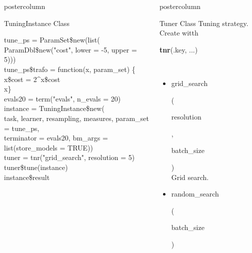 \documentclass{beamer}
\newlength{\columnheight} %
\newcommand{\codeinline}[1]{\begin{codeboxinline}#1\end{codeboxinline}}
\begin{document}
\begin{frame}[fragile]{}
\begin{columns}
\begin{column}{.245\textwidth}
\begin{beamercolorbox}[center]{postercolumn}
\begin{minipage}{.98\textwidth}
{\begin{myblock}{TuningInstance Class}
\begin{codeboxexample}
{									tune\_ps = ParamSet\$new(list(\\
									\hspace*{1ex} ParamDbl\$new("cost", lower = -5, upper = 5)))\\
									tune\_ps\$trafo = function(x, param\_set) \{\\
									\hspace*{1ex} x\$cost = 2\textasciicircum x\$cost\\
									\hspace*{1ex} x\}\\
									evals20 = term("evals", n\_evals = 20)
									\vspace{1em}
									\\
									instance = TuningInstance\$new(\\
									\hspace*{1ex} task, learner, resampling, measures, param\_set = tune\_ps,\\
									\hspace*{1ex} terminator = evals20, bm\_args = list(store\_models = TRUE))\\
									tuner = tnr("grid\_search", resolution = 5)
									\vspace{1em}
									\\
									tuner\$tune(instance)\\
									instance\$result}
							\end{codeboxexample}
						\end{myblock}
						\vfill}
				\end{minipage}
			\end{beamercolorbox}
		\end{column}
		\begin{column}{.245\textwidth}
			\begin{beamercolorbox}[center]{postercolumn}
				\begin{minipage}{.98\textwidth}
					\parbox[t][\columnheight]{\textwidth}{
						\begin{myblock}{Tuner Class}
                            Tuning strategy. Create witth \codeinline{\textbf{tnr}(.key, ...)}
							\\
							\begin{itemize}
								\item \codeinline{grid\_search}
								(\codeinline{resolution}, \codeinline{batch\_size})\\
								Grid search.
								\item \codeinline{random\_search}
								(\codeinline{batch\_size})\\

\end{itemize}
\end{myblock}}
\end{minipage}
\end{beamercolorbox}
\end{column}
\end{columns}
\end{frame}
\end{document}
